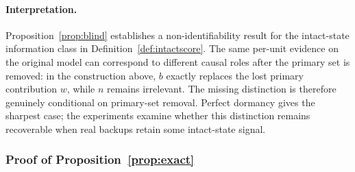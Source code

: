\paragraph{Interpretation.}
Proposition~\ref{prop:blind} establishes a non-identifiability result for the
intact-state information class in Definition~\ref{def:intactscore}.
The same per-unit evidence on the original model can correspond to different
causal roles after the primary set is removed: in the construction above, $b$
exactly replaces the lost primary contribution $w$, while $n$ remains irrelevant.
The missing distinction is therefore genuinely conditional on primary-set removal.
Perfect dormancy gives the sharpest case; the experiments examine whether this
distinction remains recoverable when real backups retain some intact-state signal.

\subsubsection{Proof of Proposition~\ref{prop:exact}}

